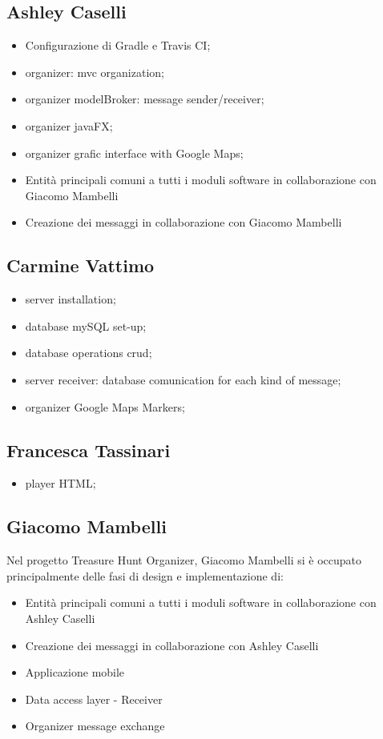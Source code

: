 \documentclass[12pt, italian]{article}
\begin{document}
\subsection{Ashley Caselli}
\begin{itemize}
	\item Configurazione di Gradle e Travis CI;
	\item organizer: mvc organization;
	\item organizer modelBroker: message sender/receiver;
	\item organizer javaFX;
	\item organizer grafic interface with Google Maps;
	\item Entità principali comuni a tutti i moduli software in collaborazione con Giacomo Mambelli
	\item Creazione dei messaggi in collaborazione con Giacomo Mambelli
\end{itemize}
\subsection{Carmine Vattimo}
\begin{itemize}
	\item server installation;
	\item database mySQL set-up;
	\item database operations crud;
	\item server receiver: database comunication for each kind of message;
	\item organizer Google Maps Markers;
\end{itemize}
\subsection{Francesca Tassinari}
\begin{itemize}
	\item player HTML;
\end{itemize}
\subsection{Giacomo Mambelli}
Nel progetto Treasure Hunt Organizer, Giacomo Mambelli si è occupato principalmente delle fasi di design e implementazione di:
\begin{itemize}
	\item Entità principali comuni a tutti i moduli software in collaborazione con Ashley Caselli
	\item Creazione dei messaggi in collaborazione con Ashley Caselli
	\item Applicazione mobile
	\item Data access layer - Receiver
	\item Organizer message exchange
\end{itemize}
\end{document}
